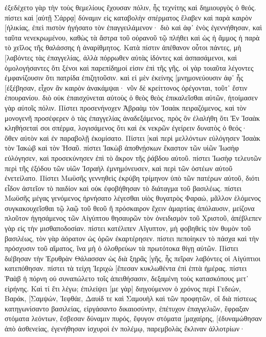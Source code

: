 ἐξεδέχετο γὰρ τὴν τοὺς θεμελίους ἔχουσαν πόλιν, ἧς τεχνίτης καὶ δημιουργὸς ὁ θεός. 
πίστει καὶ [αὐτῇ Σάρρᾳ] δύναμιν εἰς καταβολὴν σπέρματος ἔλαβεν καὶ παρὰ καιρὸν [ἡλικίας, ἐπεὶ πιστὸν ἡγήσατο τὸν ἐπαγγειλάμενον· 
διὸ καὶ ἀφ᾽ ἑνὸς ἐγεννήθησαν, καὶ ταῦτα νενεκρωμένου, καθὼς τὰ ἄστρα τοῦ οὐρανοῦ τῷ πλήθει καὶ ὡς ἡ ἄμμος ἡ παρὰ τὸ χεῖλος τῆς θαλάσσης ἡ ἀναρίθμητος. 
Κατὰ πίστιν ἀπέθανον οὗτοι πάντες, μὴ [λαβόντες τὰς ἐπαγγελίας, ἀλλὰ πόρρωθεν αὐτὰς ἰδόντες καὶ ἀσπασάμενοι, καὶ ὁμολογήσαντες ὅτι ξένοι καὶ παρεπίδημοί εἰσιν ἐπὶ τῆς γῆς. 
οἱ γὰρ τοιαῦτα λέγοντες ἐμφανίζουσιν ὅτι πατρίδα ἐπιζητοῦσιν. 
καὶ εἰ μὲν ἐκείνης [μνημονεύουσιν ἀφ᾽ ἧς [ἐξέβησαν, εἶχον ἂν καιρὸν ἀνακάμψαι· 
νῦν δὲ κρείττονος ὀρέγονται, τοῦτ᾽ ἔστιν ἐπουρανίου. διὸ οὐκ ἐπαισχύνεται αὐτοὺς ὁ θεὸς θεὸς ἐπικαλεῖσθαι αὐτῶν, ἡτοίμασεν γὰρ αὐτοῖς πόλιν. 
Πίστει προσενήνοχεν Ἀβραὰμ τὸν Ἰσαὰκ πειραζόμενος, καὶ τὸν μονογενῆ προσέφερεν ὁ τὰς ἐπαγγελίας ἀναδεξάμενος, 
πρὸς ὃν ἐλαλήθη ὅτι Ἐν Ἰσαὰκ κληθήσεταί σοι σπέρμα, 
λογισάμενος ὅτι καὶ ἐκ νεκρῶν ἐγείρειν δυνατὸς ὁ θεός· ὅθεν αὐτὸν καὶ ἐν παραβολῇ ἐκομίσατο. 
Πίστει [καὶ περὶ μελλόντων εὐλόγησεν Ἰσαὰκ τὸν Ἰακὼβ καὶ τὸν Ἠσαῦ. 
πίστει Ἰακὼβ ἀποθνῄσκων ἕκαστον τῶν υἱῶν Ἰωσὴφ εὐλόγησεν, καὶ προσεκύνησεν ἐπὶ τὸ ἄκρον τῆς ῥάβδου αὐτοῦ. 
πίστει Ἰωσὴφ τελευτῶν περὶ τῆς ἐξόδου τῶν υἱῶν Ἰσραὴλ ἐμνημόνευσεν, καὶ περὶ τῶν ὀστέων αὐτοῦ ἐνετείλατο. 
Πίστει Μωϋσῆς γεννηθεὶς ἐκρύβη τρίμηνον ὑπὸ τῶν πατέρων αὐτοῦ, διότι εἶδον ἀστεῖον τὸ παιδίον καὶ οὐκ ἐφοβήθησαν τὸ διάταγμα τοῦ βασιλέως. 
πίστει Μωϋσῆς μέγας γενόμενος ἠρνήσατο λέγεσθαι υἱὸς θυγατρὸς Φαραώ, 
μᾶλλον ἑλόμενος συγκακουχεῖσθαι τῷ λαῷ τοῦ θεοῦ ἢ πρόσκαιρον ἔχειν ἁμαρτίας ἀπόλαυσιν, 
μείζονα πλοῦτον ἡγησάμενος τῶν Αἰγύπτου θησαυρῶν τὸν ὀνειδισμὸν τοῦ Χριστοῦ, ἀπέβλεπεν γὰρ εἰς τὴν μισθαποδοσίαν. 
πίστει κατέλιπεν Αἴγυπτον, μὴ φοβηθεὶς τὸν θυμὸν τοῦ βασιλέως, τὸν γὰρ ἀόρατον ὡς ὁρῶν ἐκαρτέρησεν. 
πίστει πεποίηκεν τὸ πάσχα καὶ τὴν πρόσχυσιν τοῦ αἵματος, ἵνα μὴ ὁ ὀλοθρεύων τὰ πρωτότοκα θίγῃ αὐτῶν. 
Πίστει διέβησαν τὴν Ἐρυθρὰν Θάλασσαν ὡς διὰ ξηρᾶς [γῆς, ἧς πεῖραν λαβόντες οἱ Αἰγύπτιοι κατεπόθησαν. 
πίστει τὰ τείχη Ἰεριχὼ [ἔπεσαν κυκλωθέντα ἐπὶ ἑπτὰ ἡμέρας. 
πίστει Ῥαὰβ ἡ πόρνη οὐ συναπώλετο τοῖς ἀπειθήσασιν, δεξαμένη τοὺς κατασκόπους μετ᾽ εἰρήνης. 
Καὶ τί ἔτι λέγω; ἐπιλείψει [με γὰρ] διηγούμενον ὁ χρόνος περὶ Γεδεών, Βαράκ, [Σαμψών, Ἰεφθάε, Δαυίδ τε καὶ Σαμουὴλ καὶ τῶν προφητῶν, 
οἳ διὰ πίστεως κατηγωνίσαντο βασιλείας, εἰργάσαντο δικαιοσύνην, ἐπέτυχον ἐπαγγελιῶν, ἔφραξαν στόματα λεόντων, 
ἔσβεσαν δύναμιν πυρός, ἔφυγον στόματα [μαχαίρης, [ἐδυναμώθησαν ἀπὸ ἀσθενείας, ἐγενήθησαν ἰσχυροὶ ἐν πολέμῳ, παρεμβολὰς ἔκλιναν ἀλλοτρίων· 
